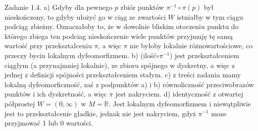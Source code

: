 \documentclass{article}
\begin{document}
Zadanie 1.4.
\newline
\newline
a) Gdyby dla pewnego $p$ zbiór punktów $\pi^{-1}\circ\pi(p)$ był nieskończony, to gdyby ułożyć go w ciąg ze zwartości $W$
istniałby w tym ciągu podciąg zbieżny. Oznaczałoby to, że w dowolnie bliskim otoczeniu punktu do którego zbiega ten podciag
nieskończenie wiele punktów przyjmuję tę samą wartość przy przekształceniu $\pi$, a więc $\pi$ nie byłoby lokalnie różnowartościowe,
co przeczy byciu lokalnym dyfeomorfizmem.\newline
b) (ilość$\circ\pi^{-1}$) jest przekształceniem ciągłym (a przynajmniej lokalnie), ze zbioru spójnego w dyskretny,
a więc z jednej z definicji spójności przekształceniem stałym.\newline
c) z treści zadania mamy lokalną dyfeomorficzność,
zaś z podpunktów a) i b) równoliczność przeciwobrazów punktów i ich dyskretność, a więc $\pi$ jest nakryciem.\newline
d) identyczność z otwartej półprostej $W=(0,\infty)$ w $M=\mathbb{R}$.
Jest lokalnym dyfeomorfizmem i niewątpliwie jest to przekształcenie gładkie,
jednak nie jest nakryciem, gdyż $\pi^{-1}$ moze przyjmować 1 lub 0 wartości.
\end{document}
